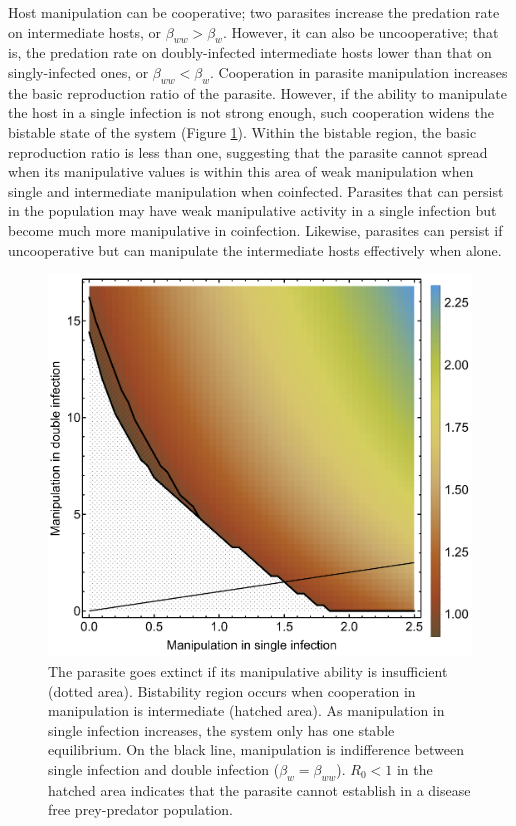 \documentclass[11pt]{article}
\begin{document}
Host manipulation can be cooperative; two parasites increase the predation rate on intermediate hosts, or $\beta_{ww} > \beta_w$. 
However, it can also be uncooperative; that is, the predation rate on doubly-infected intermediate hosts lower than that on singly-infected ones, or $\beta_{ww} < \beta_w$.
Cooperation in parasite manipulation increases the basic reproduction ratio of the parasite. 
However, if the ability to manipulate the host in a single infection is not strong enough, such cooperation widens the bistable state of the system (Figure \ref{fig:manipR0}). 
Within the bistable region, the basic reproduction ratio is less than one, suggesting that the parasite cannot spread when its manipulative values is within this area of weak manipulation when single and intermediate manipulation when coinfected. 
Parasites that can persist in the population may have weak manipulative activity in a single infection but become much more manipulative in coinfection. 
Likewise, parasites can persist if uncooperative but can manipulate the intermediate hosts effectively when alone.

\begin{figure}
\centering
\includegraphics[width=\textwidth]{Figures/manip_bifur_R0.pdf}
\caption{The parasite goes extinct if its manipulative ability is insufficient (dotted area). Bistability region occurs when cooperation in manipulation is intermediate (hatched area). As manipulation in single infection increases, the system only has one stable equilibrium. On the black line, manipulation is indifference between single infection and double infection ($\beta_w = \beta_{ww}$). $R_0 < 1$ in the hatched area indicates that the parasite cannot establish in a disease free prey-predator population.}
\label{fig:manipR0}
\end{figure}
\end{document}
